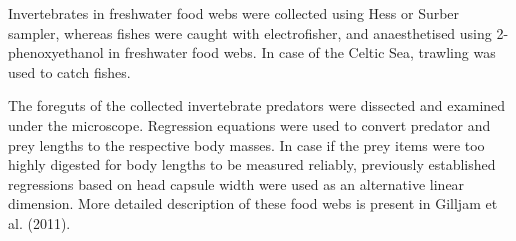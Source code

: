 \documentclass{article}
\begin{document}
Invertebrates in freshwater food webs were collected using Hess or
Surber sampler, whereas fishes were caught with electrofisher, and
anaesthetised using 2-phenoxyethanol in freshwater food webs. In case of
the Celtic Sea, trawling was used to catch fishes.

The foreguts of the collected invertebrate predators were dissected and
examined under the microscope. Regression equations were used to convert
predator and prey lengths to the respective body masses. In case if the
prey items were too highly digested for body lengths to be measured
reliably, previously established regressions based on head capsule width
were used as an alternative linear dimension. More detailed description
of these food webs is present in Gilljam et al. (2011).

\begin{landscape}\begin{table}


\end{table}
\end{landscape}
\end{document}
